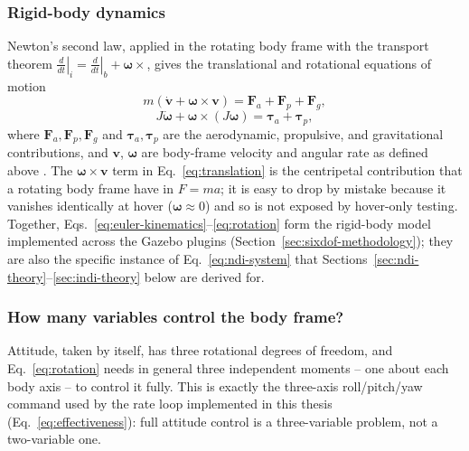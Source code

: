 \documentclass{article}
\begin{document}
\subsubsection{Rigid-body dynamics}
\label{sec:rigidbody-dynamics}
Newton's second law, applied in the rotating body frame with the transport theorem $\left.\tfrac{d}{dt}\right|_i=\left.\tfrac{d}{dt}\right|_b+\boldsymbol{\omega}\times$, gives the translational and rotational equations of motion
\begin{equation}
    m\left(\dot{\mathbf{v}}+\boldsymbol{\omega}\times\mathbf{v}\right)=\mathbf{F}_{a}+\mathbf{F}_{p}+\mathbf{F}_{g},
    \label{eq:translation}
\end{equation}
\begin{equation}
    J\dot{\boldsymbol{\omega}}+\boldsymbol{\omega}\times(J\boldsymbol{\omega})=\boldsymbol{\tau}_{a}+\boldsymbol{\tau}_{p},
    \label{eq:rotation}
\end{equation}
where $\mathbf{F}_{a},\mathbf{F}_{p},\mathbf{F}_{g}$ and $\boldsymbol{\tau}_{a},\boldsymbol{\tau}_{p}$ are the aerodynamic, propulsive, and gravitational contributions, and $\mathbf{v}$, $\boldsymbol{\omega}$ are body-frame velocity and angular rate as defined above \citep{beardmclain2012}. The $\boldsymbol{\omega}\times\mathbf{v}$ term in Eq.~\eqref{eq:translation} is the centripetal contribution that a rotating body frame have in $F=ma$; it is easy to drop by mistake because it vanishes identically at hover ($\boldsymbol{\omega}\approx0$) and so is not exposed by hover-only testing. Together, Eqs.~\eqref{eq:euler-kinematics}--\eqref{eq:rotation} form the rigid-body model implemented across the Gazebo plugins (Section~\ref{sec:sixdof-methodology}); they are also the specific instance of Eq.~\eqref{eq:ndi-system} that Sections~\ref{sec:ndi-theory}--\ref{sec:indi-theory} below are derived for.

\subsubsection{How many variables control the body frame?}
\label{sec:underactuation}
Attitude, taken by itself, has three rotational degrees of freedom, and Eq.~\eqref{eq:rotation} needs in general three independent moments -- one about each body axis -- to control it fully. This is exactly the three-axis roll/pitch/yaw command used by the rate loop implemented in this thesis (Eq.~\eqref{eq:effectiveness}): full attitude control is a three-variable problem, not a two-variable one.
\end{document}
